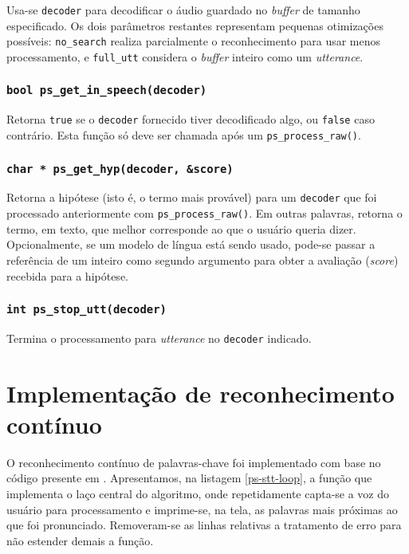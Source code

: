 Usa-se \texttt{decoder} para decodificar o áudio guardado no \textit{buffer} de tamanho especificado. Os dois parâmetros restantes representam pequenas otimizações possíveis: \texttt{no\_search} realiza parcialmente o reconhecimento para usar menos processamento, e \texttt{full\_utt} considera o \textit{buffer} inteiro como um \textit{utterance}.

\subsubsection{\texttt{bool ps\_get\_in\_speech(decoder)}}

Retorna \texttt{true} se o \texttt{decoder} fornecido tiver decodificado algo, ou \texttt{false} caso contrário. Esta função só deve ser chamada após um \texttt{ps\_process\_raw()}.

\subsubsection{\texttt{char * ps\_get\_hyp(decoder, \&score)}}

Retorna a hipótese (isto é, o termo mais provável) para um \texttt{decoder} que foi processado anteriormente com \texttt{ps\_process\_raw()}. Em outras palavras, retorna o termo, em texto, que melhor corresponde ao que o usuário queria dizer. Opcionalmente, se um modelo de língua está sendo usado, pode-se passar a referência de um inteiro como segundo argumento para obter a avaliação (\textit{score}) recebida para a hipótese.

\subsubsection{\texttt{int ps\_stop\_utt(decoder)}}
Termina o processamento para \textit{utterance} no \texttt{decoder} indicado.


\section{Implementação de reconhecimento contínuo}
\label{stt-continuous-algorithm}

O reconhecimento contínuo de palavras-chave foi implementado com base no código presente em \citep{pocketsphinxMicLoop}. Apresentamos, na listagem \ref{ps-stt-loop}, a função que implementa o laço central do algoritmo, onde repetidamente capta-se a voz do usuário para processamento e imprime-se, na tela, as palavras mais próximas ao que foi pronunciado. Removeram-se as linhas relativas a tratamento de erro para não estender demais a função.

